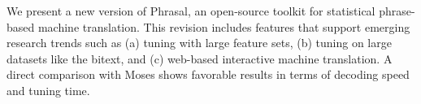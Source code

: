 We present a new version of Phrasal, an open-source toolkit for statistical phrase-based machine translation. This revision includes features that support emerging research trends such as (a) tuning with large feature sets, (b) tuning on large datasets like the bitext, and (c) web-based interactive machine translation. A direct comparison with Moses shows favorable results in terms of decoding speed and tuning time.
